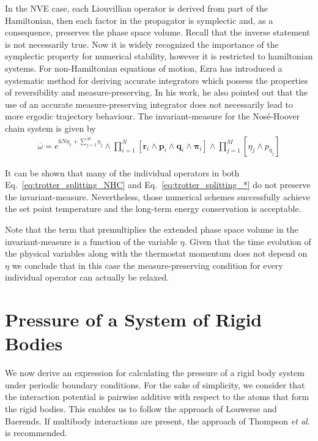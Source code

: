 \documentclass[aip,jcp,reprint,amsmath,amssymb]{revtex4-1}
\newcommand{\vt}[1]{\boldsymbol{\mathbf{#1}}}           %
\begin{document}
In the NVE case, each Liouvillian operator is derived from part of the Hamiltonian, then each factor in the propagator is symplectic and, as a consequence, preserves the phase space volume. Recall that the inverse statement is not necessarily true. Now it is widely recognized the importance of the symplectic property for numerical stability,\cite{Skeel1997} however it is restricted to hamiltonian systems. For non-Hamiltonian equations of motion, Ezra \cite{Ezra2006} has introduced a systematic method for deriving accurate integrators which possess the properties of reversibility and measure-preserving. In his work, he also pointed out that the use of an accurate measure-preserving integrator does not necessarily lead to more ergodic trajectory behaviour. The invariant-measure for the  Nos\'{e}-Hoover chain system is given by
\begin{align*}
\overline{\omega} = e^{6N \eta_1 + \sum_{j=2}^M \eta_j} \wedge \prod_{i=1}^{N}[\vt {r}_i \wedge\vt {p}_i\wedge \vt {q}_i\wedge \vt {\pi}_i ] \wedge \prod_{j=1}^{M}[ \eta_j\wedge p_{\eta_j} ]
\end{align*}

It can be shown that many of the individual operators in both Eq.~\ref{eq:trotter_splitting_NHC} and Eq.~\ref{eq:trotter_splitting_*} do not preserve the invariant-measure. Nevertheless, those numerical schemes successfully achieve the set point temperature and the long-term energy conservation is acceptable.

Note that the term that premultiplies the extended phase space volume in the invariant-measure is a function of the variable $\eta$. Given that the time evolution of the physical variables along with the thermostat momentum does not depend on $\eta$ we conclude that in this case the measure-preserving condition for every individual operator can actually be relaxed.
\section{Pressure of a System of Rigid Bodies}
\label{sec:pressure}
We now derive an expression for calculating the pressure of a rigid body system under periodic boundary conditions. For the sake of simplicity, we consider that the interaction potential is pairwise additive with respect to the atoms that form the rigid bodies. This enables us to follow the approach of Louwerse and Baerends.\cite{Louwerse2006} If multibody interactions are present, the approach of Thompson \textit{et al}.\cite{Thompson2009} is recommended.
\end{document}
